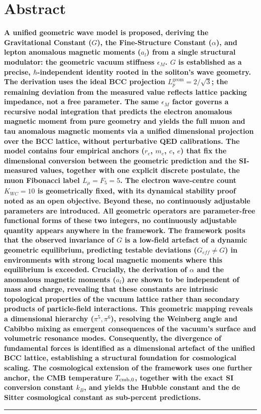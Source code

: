 \documentclass[10pt,a4paper]{article}
\begin{document}
\section*{Abstract}
{\boldmath \textbf{
A unified geometric wave model is proposed, deriving the Gravitational
Constant ($G$), the Fine-Structure Constant ($\alpha$), and lepton
anomalous magnetic moments ($a_l$) from a single structural modulator:
the geometric vacuum stiffness $\epsilon_M$. $G$ is established as a
precise, $\hbar$-independent identity rooted in the soliton's wave
geometry. The derivation uses the ideal BCC projection
$L_p^{\text{geom}} = 2/\sqrt{3}$; the remaining deviation from the
measured value reflects lattice packing impedance, not a free
parameter. The same $\epsilon_M$ factor governs a recursive nodal
integration that predicts the electron anomalous magnetic moment from
pure geometry and yields the full muon and tau anomalous magnetic
moments via a unified dimensional projection over the BCC lattice,
without perturbative QED calibrations. The model contains four empirical anchors ($r_e$, $m_e$, $c$, $e$)
that fix the dimensional conversion between the geometric prediction
and the SI-measured values, together with one explicit discrete
postulate, the muon Fibonacci label $L_\mu = F_5 = 5$. The electron
wave-centre count $K_{WC} = 10$ is geometrically fixed, with its dynamical
stability proof noted as an open objective. Beyond
these, no continuously adjustable parameters are introduced. All
geometric operators are parameter-free functional forms of these two
integers, no
continuously adjustable quantity appears anywhere in the framework. 
The framework posits that the
observed invariance of $G$ is a low-field artefact of a dynamic
geometric equilibrium, predicting testable deviations ($G_{eff} \neq
G$) in environments with strong local magnetic moments where this
equilibrium is exceeded. Crucially, the derivation of $\alpha$ and the
anomalous magnetic moments ($a_l$) are shown to be independent of mass
and charge, revealing that these constants are intrinsic topological
properties of the vacuum lattice rather than secondary products of
particle-field interactions. This geometric mapping reveals a
dimensional hierarchy ($\pi^5, \pi^6$), resolving the Weinberg angle
and Cabibbo mixing as emergent consequences of the vacuum's surface
and volumetric resonance modes. Consequently, the divergence of
fundamental forces is identified as a dimensional artefact of the
unified BCC lattice, establishing a structural foundation for
cosmological scaling. The cosmological extension of the framework
uses one further anchor, the CMB temperature
\(T_{\rm cmb,0}\), together with the exact SI conversion
constant \(k_B\), and yields the Hubble constant and the de Sitter
cosmological constant as sub-percent predictions.
}}
\\
\vspace{10pt}
\noindent\rule{\textwidth}{1pt}
\end{document}
